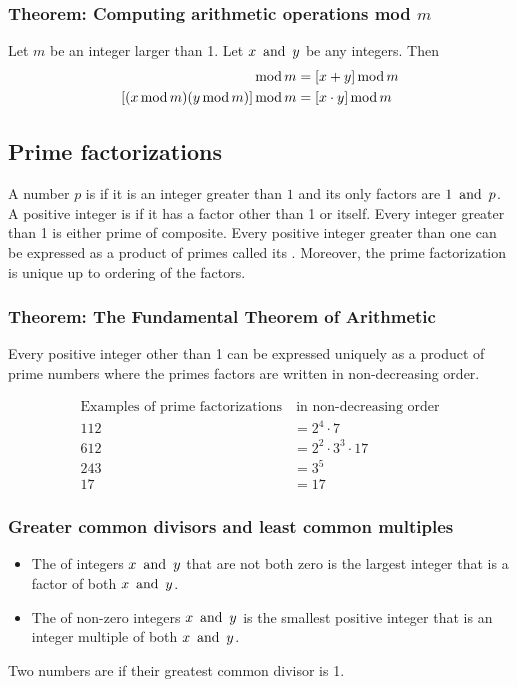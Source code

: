 \subsubsection*{Theorem: Computing arithmetic operations mod $m$}
Let $m$ be an integer larger than 1. Let $x \operatorname{~\text{and}~} y$ be any integers. Then
\begin{align*}
    [(x \tmod m) + (y \tmod m)] \tmod m & = [x + y] \tmod m     \\
    [(x \tmod m)(y \tmod m)] \tmod m    & = [x \cdot y] \tmod m
\end{align*}

\subsection{Prime factorizations}
A number $p$ is  if it is an integer greater than $1$ and its only factors are $1 \operatorname{~\text{and}~} p$. A positive integer is  if it has a factor other than 1 or itself. Every integer greater than 1 is either prime of composite. Every positive integer greater than one can be expressed as a product of primes called its . Moreover, the prime factorization is unique up to ordering of the factors.

\subsubsection*{Theorem: The Fundamental Theorem of Arithmetic}
Every positive integer other than 1 can be expressed uniquely as a product of prime numbers where the primes factors are written in non-decreasing order.

\begin{align*}
    \text{Examples of prime factorizations} & ~\text{in non-decreasing order} \\
    112                                     & = 2^4\cdot 7                    \\
    612                                     & = 2^2 \cdot 3^3 \cdot 17        \\
    243                                     & = 3^5                           \\
    17                                      & = 17
\end{align*}

\subsubsection*{Greater common divisors and least common multiples}
\begin{itemize}
    \item The  of integers $x \operatorname{~\text{and}~} y$ that are not both zero is the largest integer that is a factor of both $x \operatorname{~\text{and}~} y$.
    \item The  of non-zero integers $x \operatorname{~\text{and}~} y$ is the smallest positive integer that is an integer multiple of both $x \operatorname{~\text{and}~} y$.
\end{itemize}
Two numbers are  if their greatest common divisor is 1.

